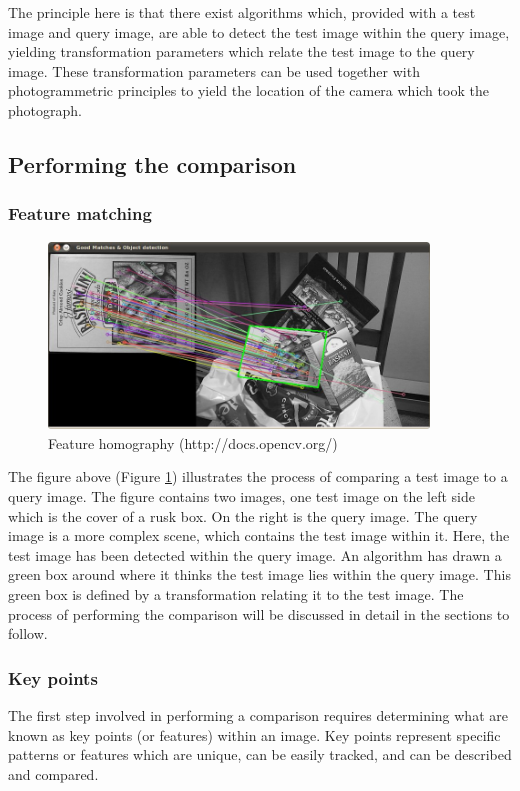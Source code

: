\documentclass[11pt,a4paper]{report}
\begin{document}
		The principle here is that there exist algorithms which, provided with a test image and query image, are able to detect the test image within the query image, yielding transformation parameters which relate the test image to the query image. These transformation parameters can be used together with photogrammetric principles to yield the location of the camera which took the photograph.
		
		\subsection{Performing the comparison}
			\subsubsection{Feature matching}
				\begin{figure}[H]
					\centering
					\includegraphics[width=0.9\textwidth]{feature_homography_example}
					\caption{Feature homography (http://docs.opencv.org/)}
					\label{fig:feature_homogrophy}
				\end{figure}
				
				The figure above (Figure \ref{fig:feature_homogrophy}) illustrates the process of comparing a test image to a query image. The figure contains two images, one test image on the left side which is the cover of a rusk box. On the right is the query image. The query image is a more complex scene, which contains the test image within it. Here, the test image has been detected within the query image. An algorithm has drawn a green box around where it thinks the test image lies within the query image. This green box is defined by a transformation relating it to the test image. The process of performing the comparison will be discussed in detail in the sections to follow.
			
			\subsubsection{Key points}
				The first step involved in performing a comparison requires determining what are known as key points (or features) within an image. Key points represent specific patterns or features which are unique, can be easily tracked, and can be described and compared.
				
\end{document}

